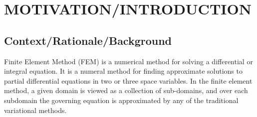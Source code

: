 




\chapter{MOTIVATION/INTRODUCTION}

\section{{\bf{Context/Rationale/Background}}}
Finite Element Method (FEM) is a numerical method for solving a differential or integral equation. It is a numeral method for finding approximate solutions to partial differential equations in two or three space variables. In the finite element method, a given domain is viewed as a collection of sub-domains, and over each subdomain the governing equation is approximated by any of the traditional variational methods.


